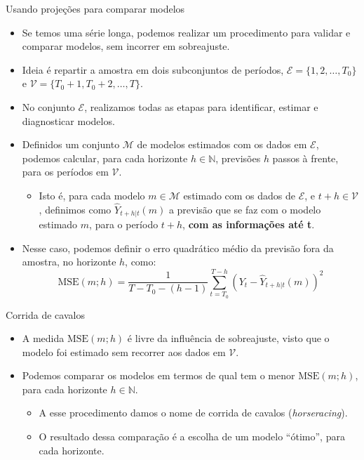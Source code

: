 \documentclass[11pt]{beamer}
\begin{document}
\begin{frame}{Usando projeções para comparar modelos}
\begin{itemize}
	\item Se temos uma série longa, podemos realizar um procedimento para validar e comparar modelos, sem incorrer em sobreajuste.
	\item Ideia é repartir a amostra em dois subconjuntos de períodos, $\mathcal{E} = \{1,2,\ldots,T_0\}$ e $\mathcal{V} = \{T_0+1,T_0+2,\ldots, T\}$.
	\item No conjunto $\mathcal{E}$, realizamos todas as etapas para identificar, estimar e diagnosticar modelos.
	\item Definidos um conjunto $ \mathcal{M}$ de modelos estimados com os dados em $ \mathcal{E}$, podemos calcular, para cada horizonte $h \in \mathbb{N}$, previsões $h$ passos à frente, para os períodos em $\mathcal{V}$.
	\begin{itemize}
 	\item Isto é, para cada modelo $m \in \mathcal{M}$ estimado com os dados de $\mathcal{E}$, e $t+h \in \mathcal{V}$, definimos como $\hat{Y}_{t+h|t}(m)$ a previsão que se faz com o modelo estimado $m$, para o período $t+h$, \textbf{com as informações até t}.
	\end{itemize}

	\item Nesse caso, podemos definir o erro quadrático médio da previsão fora da amostra, no horizonte $h$, como:
	$$\text{MSE}(m;h) =  \frac{1}{T-T_0-(h-1)}\sum_{t=T_0}^{T-h} (Y_t - \hat{Y}_{t+h|t}(m))^2$$
	
\end{itemize}
\end{frame}
\begin{frame}{Corrida de cavalos}
	\begin{itemize}
		\item A medida 	$\text{MSE}(m;h)$ é livre da influência de sobreajuste, visto que o modelo foi estimado sem recorrer aos dados em $\mathcal{V}$.
		\item Podemos comparar os modelos em termos de qual tem o menor $\text{MSE}(m;h)$, para cada horizonte $h \in \mathbb{N}$.
		\begin{itemize}
			\item A esse procedimento damos o nome de corrida de cavalos (\textit{horseracing}).
			\item O resultado dessa comparação é a escolha de um modelo ``ótimo'', para cada horizonte.
		\end{itemize}
	\end{itemize}
\end{frame}
\end{document}
